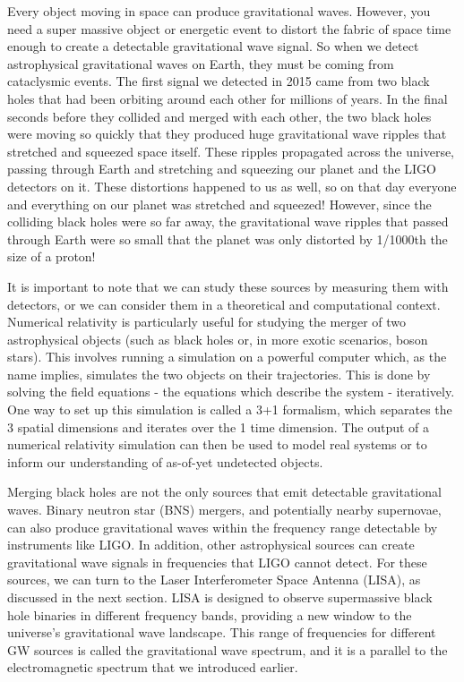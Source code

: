 Every object moving in space can produce gravitational waves. However, you need a super massive object or energetic event to distort the fabric of space time enough to create a detectable gravitational wave signal. So when we detect astrophysical gravitational waves on Earth, they must be coming from cataclysmic events. The first signal we detected in 2015 came from two black holes that had been orbiting around each other for millions of years. In the final seconds before they collided and merged with each other, the two black holes were moving so quickly that they produced huge gravitational wave ripples that stretched and squeezed space itself. These ripples propagated across the universe, passing through Earth and stretching and squeezing our planet and the LIGO detectors on it. These distortions happened to us as well, so on that day everyone and everything on our planet was stretched and squeezed! However, since the colliding black holes were so far away, the gravitational wave ripples that passed through Earth were so small that the planet was only distorted by 1/1000th the size of a proton! 

It is important to note that we can study these sources by measuring them with detectors, or we can consider them in a theoretical and computational context. Numerical relativity is particularly useful for studying the merger of two astrophysical objects (such as black holes or, in more exotic scenarios, boson stars). This involves running a simulation on a powerful computer which, as the name implies, simulates the two objects on their trajectories. This is done by solving the field equations - the equations which describe the system - iteratively. One way to set up this simulation is called a 3+1 formalism, which separates the 3 spatial dimensions and iterates over the 1 time dimension. The output of a numerical relativity simulation can then be used to model real systems or to inform our understanding of as-of-yet undetected objects.

Merging black holes are not the only sources that emit detectable gravitational waves. Binary neutron star (BNS) mergers, and potentially nearby supernovae, can also produce gravitational waves within the frequency range detectable by instruments like LIGO. In addition, other astrophysical sources can create gravitational wave signals in frequencies that LIGO cannot detect. For these sources, we can turn to the Laser Interferometer Space Antenna (LISA), as discussed in the next section. LISA is designed to observe supermassive black hole binaries in different frequency bands, providing a new window to the universe's gravitational wave landscape. This range of frequencies for different GW sources is called the gravitational wave spectrum, and it is a parallel to the electromagnetic spectrum that we introduced earlier.


